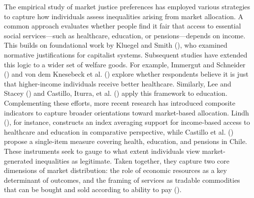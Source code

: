 \documentclass[
  13pt,
]{article}
\begin{document}
The empirical study of market justice preferences has employed various
strategies to capture how individuals assess inequalities arising from
market allocation. A common approach evaluates whether people find it
fair that access to essential social services---such as healthcare,
education, or pensions---depends on income. This builds on foundational
work by Kluegel and Smith
(), who examined normative
justifications for capitalist systems. Subsequent studies have extended
this logic to a wider set of welfare goods. For example, Immergut and
Schneider () and von dem Knesebeck
et al. () explore whether
respondents believe it is just that higher-income individuals receive
better healthcare. Similarly, Lee and Stacey
() and Castillo, Iturra, et al.
() apply this framework to
education. Complementing these efforts, more recent research has
introduced composite indicators to capture broader orientations toward
market-based allocation. Lindh (),
for instance, constructs an index averaging support for income-based
access to healthcare and education in comparative perspective, while
Castillo et al. ()
propose a single-item measure covering health, education, and pensions
in Chile. These instruments seek to gauge to what extent individuals
view market-generated inequalities as legitimate. Taken together, they
capture two core dimensions of market distribution: the role of economic
resources as a key determinant of outcomes, and the framing of services
as tradable commodities that can be bought and sold according to ability
to pay ().
\end{document}

